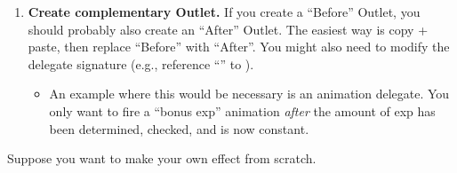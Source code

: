 \begin{enumerate}
{	}
	\item{\textbf{Create complementary Outlet.} If you create a ``Before'' Outlet, you should probably also create an ``After'' Outlet. The easiest way is copy + paste, then replace ``Before'' with ``After''. You might also need to modify the delegate signature (e.g., reference ``\code{\&}'' to ).
		\begin{itemize}
			\item{An example where this would be necessary is an animation delegate. You only want to fire a ``bonus exp'' animation \textit{after} the amount of exp has been determined, checked, and is now constant.}
		\end{itemize}
	}
\end{enumerate}


Suppose you want to make your own effect from scratch. 

